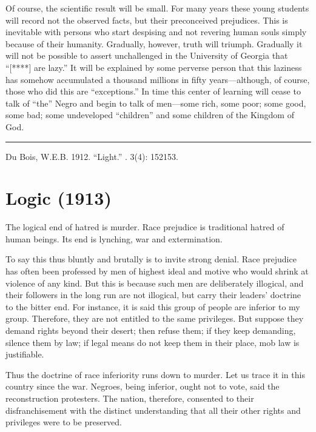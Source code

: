 \documentclass[letterpaper,10pt,english]{jupyterBook}
\begin{document}
\sphinxAtStartPar
Of course, the scientific result will be small. For many years these young students will record not the observed facts, but their preconceived prejudices. This is inevitable with persons who start despising and not revering human souls simply because of their humanity. Gradually, however, truth will triumph.	Gradually it will not be possible to assert unchallenged in the University of Geor­gia that “{[}****{]} are lazy.” It will be explained by some perverse per­son that this laziness has somehow accumulated a thousand millions in fifty years—although, of course, those who did this are “exceptions.” In time this center of learning will cease to talk of “the” Negro and begin to talk of men—some rich, some poor; some good, some bad; some undeveloped “children” and some children of the Kingdom of God.


\bigskip\hrule\bigskip


\sphinxAtStartPar
{} Du Bois, W.E.B. 1912. “Light.” . 3(4): 152\sphinxhyphen{}153.


\section{Logic (1913)}
\label{\detokenize{Volumes/06/02/logic:logic-1913}}\label{\detokenize{Volumes/06/02/logic::doc}}
\sphinxAtStartPar
The logical end of hatred is murder. Race prejudice is traditional hatred of human beings. Its end is lynching, war and extermination.

\sphinxAtStartPar
To say this thus bluntly and brutally is to invite strong denial. Race prejudice has often been professed by men of highest ideal and motive who would shrink at violence of any kind. But this is because such men are deliberately illogical, and their followers in the long run are not illogical, but carry their leaders’ doctrine to the bitter end. For instance, it is said this group of people are inferior to my group. Therefore, they are not entitled to the same privileges. But suppose they demand rights beyond their desert; then refuse them; if they keep demanding, silence them by law; if legal means do not keep them in their place, mob law is justifiable.

\sphinxAtStartPar
Thus the doctrine of race inferiority runs down to murder. Let us trace it in this country since the war. Negroes, being inferior, ought not to vote, said the reconstruction protesters. The nation, therefore, consented to their disfranchisement with the distinct understanding that all their other rights and privileges were to be preserved.
\end{document}
